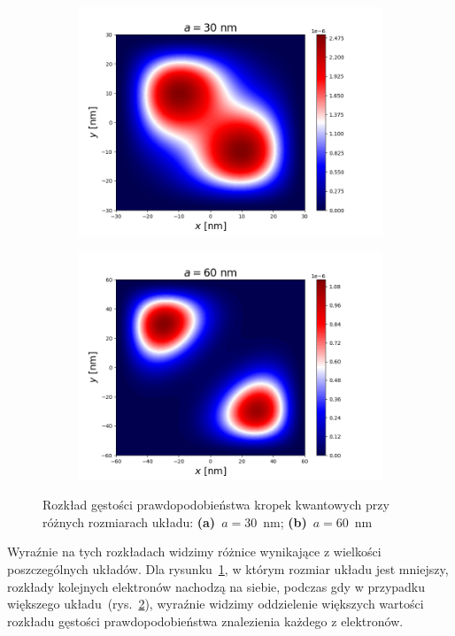 \documentclass{article}
\begin{document}
\begin{figure}[htp!]
    \centering
\begin{subfigure}{.49\textwidth}
    \includegraphics[width=1.0\linewidth]{ex2_$a = 30$ nm.png}
    \caption{}
    \label{fig:ex3:30cm}
\end{subfigure}
\begin{subfigure}{.49\textwidth}
    \includegraphics[width=1.0\linewidth]{ex2_$a = 60$ nm.png}
    \caption{}
    \label{fig:ex3:60 mm}
\end{subfigure}
\caption{Rozkład gęstości prawdopodobieństwa kropek kwantowych przy różnych rozmiarach układu: \textbf{(a)}~$a = 30$~nm; \textbf{(b)}~$a = 60$~nm}
\label{fig:rozmiary kropek}
\end{figure}
Wyraźnie na tych rozkładach widzimy różnice wynikające z wielkości poszczególnych układów.
Dla rysunku~\ref{fig:ex3:30cm}, w którym rozmiar układu jest mniejszy, rozkłady kolejnych elektronów nachodzą na siebie, podczas gdy w przypadku większego układu~(rys.~\ref{fig:ex3:60 mm}), wyraźnie widzimy oddzielenie większych wartości rozkładu gęstości prawdopodobieństwa znalezienia każdego z elektronów.
\end{document}
